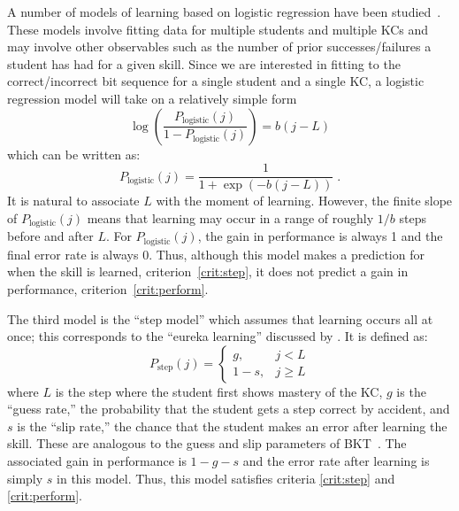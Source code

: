 \documentclass{edm_template}
\begin{document}
A number of models of learning based on 
logistic regression have been studied~\cite{cen_learning_2006,%
pavlik_performance_2009,chi_instructional_2011}.  
These models involve fitting data for 
multiple students and multiple KCs and may involve other observables
such as the number of prior successes/failures a student has had for 
a given skill.
Since we are interested in fitting
to the correct/incorrect bit sequence for a single student 
and a single KC, a logistic regression model will take on a
relatively simple form 
%
\begin{equation}
    \log\left(\frac{P_\mathrm{logistic}(j)}{1-P_\mathrm{logistic}(j)}\right)= 
                 b (j-L) 
\end{equation}
which can be written as:
\begin{equation}
    P_\mathrm{logistic}(j)= \frac{1}{1+\exp\left(-b (j-L)\right)} \; .
\end{equation}
%
It is natural to associate $L$ with the moment of learning.  However,
the finite slope of $P_\mathrm{logistic}(j)$ means that learning may
occur in a range of roughly $1/b$ steps before and after $L$.  For
$P_\mathrm{logistic}(j)$, the gain in performance is always 1 and the
final error rate is always 0.  Thus, although this model makes a
prediction for when the skill is learned, criterion~\ref{crit:step},
it does not predict a gain in performance,
criterion~\ref{crit:perform}.

The third model is the ``step model'' which assumes that learning 
occurs all at once; this corresponds to the ``eureka learning''
discussed by \cite{baker_detecting_2011}.   It is defined as:
%
\begin{equation}
    P_\mathrm{step}(j)= \left\{\begin{array}{cc}
                 g, & j<L \\
                 1-s, & j\ge L 
                 \end{array} \right. 
\end{equation}
%
where $L$ is the step where the student first shows mastery of the KC,
$g$ is the ``guess rate,'' the probability that the student gets a
step correct by accident, and $s$ is the ``slip rate,'' the chance
that the student makes an error after learning the skill.  These are
analogous to the guess and slip parameters of
BKT~\cite{corbett_knowledge_1995}.  The associated gain in performance
is $1-g-s$ and the error rate after learning is simply $s$ in this
model.  Thus, this model satisfies criteria \ref{crit:step} and
\ref{crit:perform}.
\end{document}
